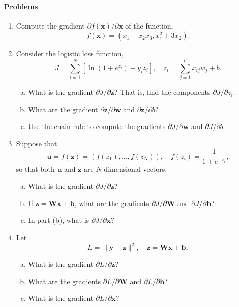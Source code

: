 \documentclass[11pt]{article}
\newcommand{\bbf}{\mathbf{b}}
\newcommand{\ubf}{\mathbf{u}}
\newcommand{\wbf}{\mathbf{w}}
\newcommand{\xbf}{\mathbf{x}}
\newcommand{\ybf}{\mathbf{y}}
\newcommand{\zbf}{\mathbf{z}}
\newcommand{\Wbf}{\mathbf{W}}
\begin{document}
\paragraph*{Problems}
\begin{enumerate}
\item Compute the gradient $\partial f(\xbf)/\partial \xbf$ of the function,
\[
    f(\xbf) = (x_1+x_2x_3,x_1^2+3x_2).
\]

\item Consider the logistic loss function, 
\[
      J = \sum_{i=1}^N\left[ \ln(1+e^{z_i}) - y_iz_i \right], \quad z_i = \sum_{j=1}^p x_{ij}w_j + b.
\]
\begin{enumerate}[(a)]
\item What is the gradient $\partial J/\partial \zbf$?  That is, find the components $\partial J/\partial z_i$.
\item What are the gradient $\partial \zbf/\partial \wbf$ and $\partial \zbf/\partial b$?
\item Use the chain rule to compute the gradients $\partial J/\partial \wbf$ and $\partial J/\partial b$.
\end{enumerate}

\item Suppose that 
\[  
    \ubf = f(\zbf) = (f(z_1),\ldots,f(z_N)), \quad f(z_i) = \frac{1}{1+e^{-z_i}},
\]
so that both $\ubf$ and $\zbf$ are $N$-dimensional vectors.
\begin{enumerate}[(a)]
\item What is the gradient $\partial J/\partial \zbf$?
\item If $\zbf = \Wbf\xbf + \bbf$, what are the gradients $\partial J/\partial \Wbf$ and $\partial J/\partial \bbf$?
\item In part (b), what is $\partial J/\partial \xbf$?
\end{enumerate}

\item Let
\[
    L = \|\ybf -\zbf\|^2, \quad \zbf = \Wbf\xbf+\bbf,
\]
\begin{enumerate}[(a)]
\item What is the gradient $\partial L/\partial \zbf$?
\item What are the gradients $\partial L/\partial \Wbf$ and $\partial L/\partial \bbf$?
\item What is the gradient $\partial L/\partial \xbf$?
\end{enumerate}
\end{enumerate}
\end{document}
